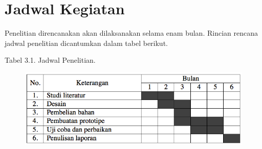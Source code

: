 \documentclass{jtetiproposalskripsi}
\begin{document}
\section{Jadwal Kegiatan}
Penelitian direncanakan akan dilaksanakan selama enam bulan. Rincian rencana jadwal penelitian dicantumkan dalam tabel berikut.

\begin{center}
Tabel 3.1. Jadwal Penelitian.
\end{center}
\vspace{-0.5cm}
\begin{figure}[ht!]
  \centering
    \includegraphics[width=13cm]{gambar/timeline}
\end{figure}

\end{document}
